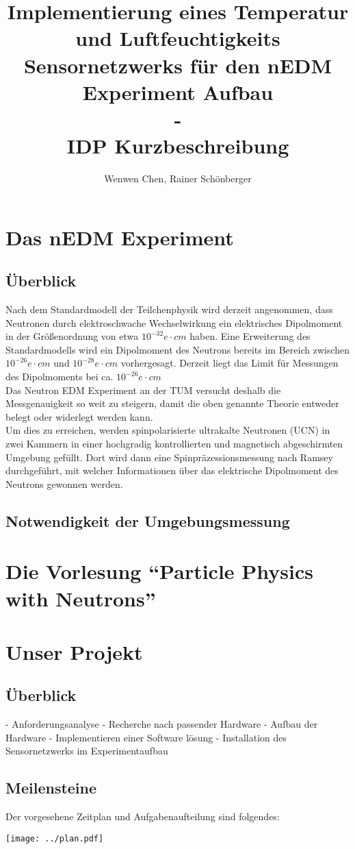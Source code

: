 \documentclass{article} %
\title{Implementierung eines Temperatur und Luftfeuchtigkeits Sensornetzwerks für den nEDM Experiment Aufbau\\-\\IDP Kurzbeschreibung}
\author{Wenwen Chen, Rainer Schönberger}
\begin{document}
\maketitle
\section*{Das nEDM Experiment}
\subsection*{Überblick}
Nach dem Standardmodell der Teilchenphysik wird derzeit angenommen, dass
Neutronen durch elektroschwache Wechselwirkung ein elektrisches Dipolmoment
in der Größenordnung von etwa $10^{-32}e\cdot cm$ haben. Eine Erweiterung des
Standardmodells wird ein Dipolmoment des Neutrons bereits im Bereich zwischen
$10^{-26}e\cdot cm$ und $10^{-28}e\cdot cm$ vorhergesagt. Derzeit liegt das
Limit für Messungen des Dipolmoments bei ca. $10^{-26}e\cdot cm$\\
Das Neutron EDM Experiment an der TUM versucht deshalb die Messgenauigkeit so
weit zu steigern, damit die oben genannte Theorie entweder belegt oder
widerlegt werden kann.\\
Um dies zu erreichen, werden spinpolarisierte ultrakalte Neutronen (UCN) in
zwei Kammern in einer hochgradig kontrollierten und magnetisch abgeschirmten
Umgebung gefüllt. Dort wird dann eine Spinpräzessionsmessung nach Ramsey
durchgeführt, mit welcher Informationen über das elektrische Dipolmoment des
Neutrons gewonnen werden.
\subsection*{Notwendigkeit der Umgebungsmessung}
\section*{Die Vorlesung ``Particle Physics with Neutrons''}
\section*{Unser Projekt}
\subsection*{Überblick}
- Anforderungsanalyse
- Recherche nach passender Hardware
- Aufbau der Hardware
- Implementieren einer Software lösung
- Installation des Sensornetzwerks im Experimentaufbau
\subsection*{Meilensteine}
Der vorgesehene Zeitplan und Aufgabenaufteilung sind folgendes:
\begin{center}
\texttt{[image: ../plan.pdf]}
\end{center}
\end{document}
